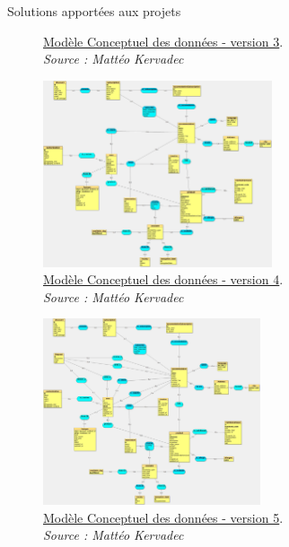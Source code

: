 \documentclass{beamer}
\begin{document}
\begin{frame}[label=realisation]{Solutions apportées aux projets}
\begin{center}
{\begin{figure}[t]
				\caption{	
					\centering			
  					\href{https://github.com/Matteo-K/Soutenance_E-delic/blob/main/img/conception/mcd_V3.jpg}{\underline{Modèle Conceptuel des données - version 3}}.\\
  					\textit{Source : Mattéo Kervadec}
				}
  				\label{fig:mcdV3}
  			\end{figure}
		}
		 {
			\addtocounter{figure}{3}
			\begin{figure}[t]
  				\includegraphics[height=5.5cm]{../img/conception/mcd_V4.jpg}
				\caption{	
					\centering			
  					\href{https://github.com/Matteo-K/Soutenance_E-delic/blob/main/img/conception/mcd_V4.jpg}{\underline{Modèle Conceptuel des données - version 4}}.\\
  					\textit{Source : Mattéo Kervadec}
				}
  				\label{fig:mcdV4}
  			\end{figure}
		}
		\only<9> {
			\addtocounter{figure}{4}
			\begin{figure}[t]
  				\includegraphics[height=5.5cm]{../img/conception/mcd_V5.jpg}
				\caption{	
					\centering			
  					\href{https://github.com/Matteo-K/Soutenance_E-delic/blob/main/img/conception/mcd_V5.jpg}{\underline{Modèle Conceptuel des données - version 5}}.\\
  					\textit{Source : Mattéo Kervadec}
				}
  				\label{fig:mcdV5}
  			\end{figure}
		}
	\end{center}
	\vfill
\end{frame}
\end{document}
